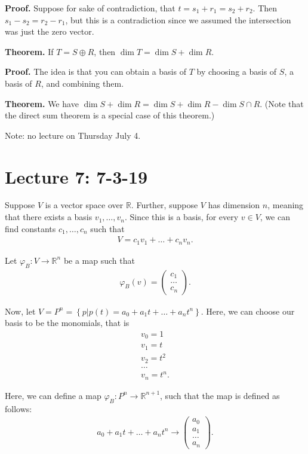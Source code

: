 \documentclass{article}
\newcommand{\mat}[1]{\begin{pmatrix}#1\end{pmatrix}}
\newcommand{\RR}{\mathbb{R}}
\begin{document}
{\bf Proof.} Suppose for sake of contradiction, that $t = s_1 + r_1 = s_2 + r_2$.  Then $s_1 - s_2 = r_2 - r_1$, but this is a contradiction since we assumed the intersection was just the zero vector.

{\bf Theorem.} If $T = S \oplus R$, then $\dim T = \dim S + \dim R$.

{\bf Proof.} The idea is that you can obtain a basis of $T$ by choosing a basis of $S$, a basis of $R$, and combining them.

{\bf Theorem.} We have $\dim S + \dim R = \dim S + \dim R - \dim S \cap R$. (Note that the direct sum theorem is a special case of this theorem.)

Note: no lecture on Thursday July 4.

\section{Lecture 7: 7-3-19}

Suppose $V$ is a vector space over $\mathbb{R}$.  Further, suppose $V$ has dimension $n$, meaning that there exists a basis $v_1, \dots, v_n$.  Since this is a basis, for every $v \in V$, we can find constants $c_1, \dots, c_n$ such that
\begin{align*}
  V = c_1 v_1 + \dots + c_n v_n.
\end{align*}

Let $\varphi_B: V \to \RR^n$ be a map such that
\begin{align*}
  \varphi_B(v) = \mat{c_1 \\ \dots \\ c_n}.
\end{align*}

Now, let $V = P^n = \left\{ p | p(t) = a_0 + a_1 t + \dots + a_n t^n \right\}$.  Here, we can choose our basis to be the monomials, that is
\begin{align*}
  v_0 = 1 \\ 
  v_1 = t \\
  v_2 = t^2 \\
  \dots \\
  v_n = t^n.
\end{align*}

Here, we can define a map $\varphi_B : P^n \to \RR^{n+1}$, such that the map is defined as follows:
\begin{align*}
  a_0 + a_1 t + \dots + a_n t^n \to \mat{a_0 \\ a_1 \\ \dots \\ a_n}.
\end{align*}
\end{document}
